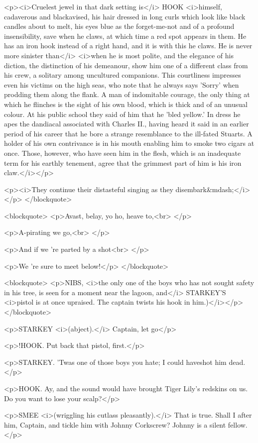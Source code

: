 <p><i>Cruelest jewel in that dark setting is</i> HOOK <i>himself,
cadaverous and blackavised, his hair dressed in long curls which look
like black candles about to melt, his eyes blue as the forget-me-not
and of a profound insensibility, save when he claws, at which time a
red spot appears in them. He has an iron hook instead of a right
hand, and it is with this he claws. He is never more sinister
than</i> <i>when he is most polite, and the elegance of his diction,
the distinction of his demeanour, show him one of a different class
from his crew, a solitary among uncultured companions. This
courtliness impresses even his victims on the high seas, who note
that he always says 'Sorry' when prodding them along the flank. A man
of indomitable courage, the only thing at which he flinches is the
sight of his own blood, which is thick and of an unusual colour. At
his public school they said of him that he 'bled yellow.' In dress he
apes the dandiacal associated with Charles II., having heard it said
in an earlier period of his career that he bore a strange resemblance
to the ill-fated Stuarts. A holder of his own contrivance is in his
mouth enabling him to smoke two cigars at once. Those, however, who
have seen him in the flesh, which is an inadequate term for his
earthly tenement, agree that the grimmest part of him is his iron
claw.</i></p>

<p><i>They continue their distasteful singing as they
disembark&mdash;</i></p>
</blockquote>

<blockquote>
<p>Avast, belay, yo ho, heave to,<br>
</p>

<p>A-pirating we go,<br>
</p>

<p>And if we 're parted by a shot<br>
</p>

<p>We 're sure to meet below!</p>
</blockquote>

<blockquote>
<p>NIBS, <i>the only one of the boys who has not sought safety in his
tree, is seen for a moment near the lagoon, and</i> STARKEY'S
<i>pistol is at once upraised. The captain twists his hook in
him.)</i></p>
</blockquote>

<p>STARKEY <i>(abject).</i> Captain, let go</p>

<p>!HOOK. Put back that pistol, first.</p>

<p>STARKEY. 'Twas one of those boys you hate; I could haveshot him
dead.</p>

<p>HOOK. Ay, and the sound would have brought Tiger Lily's redskins
on us. Do you want to lose your scalp?</p>

<p>SMEE <i>(wriggling his cutlass pleasantly).</i> That is true.
Shall I after him, Captain, and tickle him with Johnny Corkscrew?
Johnny is a silent fellow.</p>

